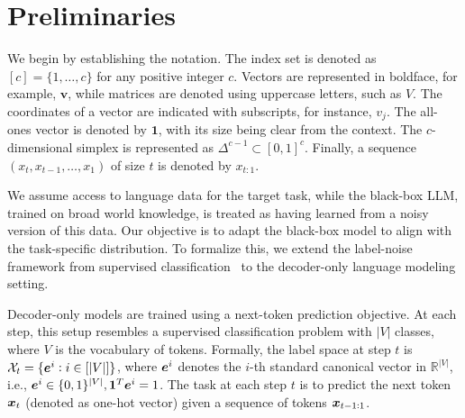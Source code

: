 
\section{Preliminaries}
\label{sec:preliminaries}

We begin by establishing the notation. The index set is denoted as $[c] = \{1, \dots, c\}$ for any positive integer $c$. Vectors are represented in boldface, for example, $\bm{v}$, while matrices are denoted using uppercase letters, such as $V$. The coordinates of a vector are indicated with subscripts, for instance, $v_j$. 
The all-ones vector is denoted by $\mathbf{1}$, with its size being clear from the context. The $c$-dimensional simplex is represented as $\Delta^{c-1} \subset [0,1]^c$. Finally, a sequence $(x_{t}, x_{t-1}, \dots, x_1)$ of size $t$ is denoted by $x_{t:1}$. 

We assume access to language data for the target task, while the black-box LLM, trained on broad world knowledge, is treated as having learned from a noisy version of this data. Our objective is to adapt the black-box model to align with the task-specific distribution. To formalize this, we extend the label-noise framework from supervised classification~\citep{patrini2017making} to the decoder-only language modeling setting.


Decoder-only models are trained using a next-token prediction objective. At each step, this setup resembles a supervised classification problem with $|V|$ classes, where $V$ is the vocabulary of tokens.   Formally, the label space at step $t$ is ${\cal X}_t = \{\bm{e}^i : i \in [|V|]\}$, where $\bm{e}^i$ denotes the $i$-th standard canonical vector in $\mathbb R^{|V|}$, i.e., $\bm{e}^i \in \{0,1\}^{|V|}, \mathbf{1}^T\bm{e}^i=1$. The task at each step $t$ is to predict the next token 
$\bm{x}_t$ (denoted as one-hot vector) 
given a sequence of tokens $\bm{x}_{t-1:1}$. 


